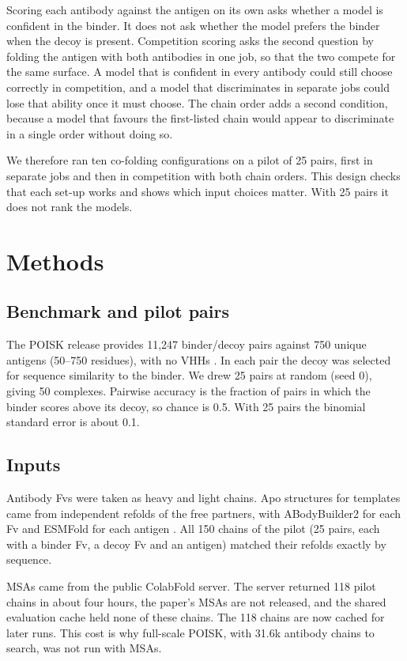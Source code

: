 \documentclass[11pt,a4paper]{article}
\begin{document}
Scoring each antibody against the antigen on its own asks whether a model is confident in the binder.
It does not ask whether the model prefers the binder when the decoy is present.
Competition scoring asks the second question by folding the antigen with both antibodies in one job, so that the two compete for the same surface.
A model that is confident in every antibody could still choose correctly in competition, and a model that discriminates in separate jobs could lose that ability once it must choose.
The chain order adds a second condition, because a model that favours the first-listed chain would appear to discriminate in a single order without doing so.

We therefore ran ten co-folding configurations on a pilot of 25 pairs, first in separate jobs and then in competition with both chain orders.
This design checks that each set-up works and shows which input choices matter.
With 25 pairs it does not rank the models.

\section{Methods}
\label{sec:methods}

\subsection{Benchmark and pilot pairs}

The POISK release provides 11,247 binder/decoy pairs against 750 unique antigens (50--750 residues), with no VHHs \cite{poisk}.
In each pair the decoy was selected for sequence similarity to the binder.
We drew 25 pairs at random (seed 0), giving 50 complexes.
Pairwise accuracy is the fraction of pairs in which the binder scores above its decoy, so chance is 0.5.
With 25 pairs the binomial standard error is about 0.1.

\subsection{Inputs}

Antibody Fvs were taken as heavy and light chains.
Apo structures for templates came from independent refolds of the free partners, with ABodyBuilder2 for each Fv \cite{abodybuilder2} and ESMFold for each antigen \cite{esmfold}.
All 150 chains of the pilot (25 pairs, each with a binder Fv, a decoy Fv and an antigen) matched their refolds exactly by sequence.

MSAs came from the public ColabFold server.
The server returned 118 pilot chains in about four hours, the paper's MSAs are not released, and the shared evaluation cache held none of these chains.
The 118 chains are now cached for later runs.
This cost is why full-scale POISK, with 31.6k antibody chains to search, was not run with MSAs.
\end{document}
